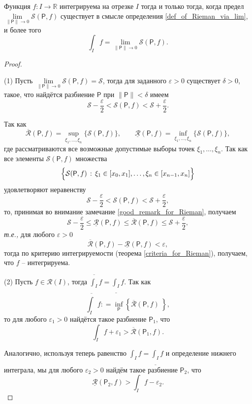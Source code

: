 \begin{theorem}\label{int_Rimean_as_limit}
 Функция $f:I \to \mathbb{R}$ интегрируема на отрезке $I$ тогда и только тогда, когда предел $\lim\limits_{\|\mathsf{P}\| \to 0} \mathcal{S}(\mathsf{P},f)$ существует в смысле определения \ref{def_of_Rieman_via_lim}, и более того
    \[
     \int_I f = \lim_{\|\mathsf{P}\| \to 0} \mathcal{S}(\mathsf{P},f).
    \]
\end{theorem}
\begin{proof}~

(1)  Пусть $\lim\limits_{\|\mathsf{P}\| \to 0} \mathcal{S}(\mathsf{P},f) = \mathcal{S}$, тогда для заданного $\varepsilon>0$ существует $\delta>0$, такое, что найдётся разбиение $\mathsf{P}$ при $\|\mathsf{P}\| <\delta$ имеем
    \[
     \mathcal{S} - \frac{\varepsilon}{2} < \mathcal{S}(\mathsf{P},f) < \mathcal{S} + \frac{\varepsilon}{2}.
    \]

Так как 
\[
 \overline{\mathcal{R}}(\mathsf{P},f) = \sup_{\xi_1,\ldots, \xi_n} \{ \mathcal{S}(\mathsf{P},f) \}, \qquad  \underline{\mathcal{R}}(\mathsf{P},f) = \inf_{\xi_1,\ldots, \xi_n} \{ \mathcal{S}(\mathsf{P},f) \}, 
\]
где рассматриваются все возможные допустимые выборы точек $\xi_1,\ldots, \xi_n$. Так как все элементы $\mathcal{S}(\mathsf{P},f)$ множества 
\[
 \Bigl\{ \mathcal{S}(\mathsf{P},f)\, :\, \xi_1 \in [x_0,x_1], \ldots, \xi_n\in [x_{n-1},x_n]  \Bigr\}
\]
удовлетворяют неравенству
\[
 \mathcal{S} - \frac{\varepsilon}{2} < \mathcal{S}(\mathsf{P},f) < \mathcal{S} + \frac{\varepsilon}{2},
\]
то, принимая во внимание замечание \ref{good_remark_for_Rieman}, получаем
\[
 \mathcal{S} - \frac{\varepsilon}{2} \le \underline{\mathcal{R}}(\mathsf{P},f) \le \overline{\mathcal{R}}(\mathsf{P},f) \le \mathcal{S} + \frac{\varepsilon}{2},
\]
\textit{т.е.,} для любого $\varepsilon >0$
\[
  \overline{\mathcal{R}}(\mathsf{P},f) - \underline{\mathcal{R}}(\mathsf{P},f) < \varepsilon,
\]
тогда по критерию интегрируемости (теорема \ref{criteria_for_Rieman}), получаем, что $f$ -- интегрируема.

(2) Пусть $f\in \mathscr{R}(I)$, тогда $\overline{\int_I}f = \underline{\int_I}f$. Так как 
\[
 \overline{\int_I}f: = \inf_\mathsf{P} \left\{ \overline{\mathcal{R}}(\mathsf{P},f) \ \right\},
\]
то для любого $\varepsilon_1 >0$ найдётся такое разбиение $\mathsf{P}_1$, что
\[
 \int_I f + \varepsilon_1 > \overline{\mathcal{R}}(\mathsf{P}_1,f).
\]

Аналогично, используя теперь равенство $\int_I f = \underline{\int_I}f$ и определение нижнего интеграла, мы для любого $\varepsilon_2>0$ найдём такое разбиение $\mathsf{P}_2$, что 
\[
 \underline{\mathcal{R}}(\mathsf{P}_2,f) > \int_I f -\varepsilon_2.
\]



\end{proof}
